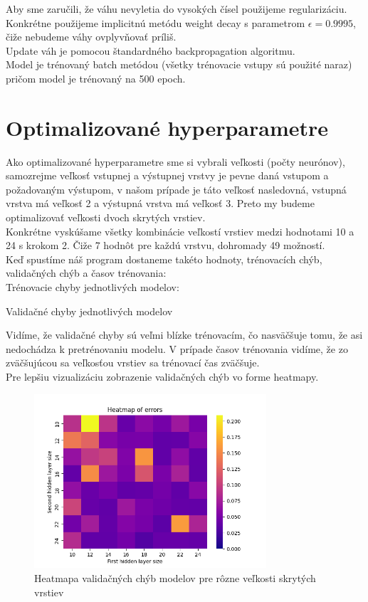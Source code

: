 \documentclass[a4paper]{article}
\begin{document}
	Aby sme zaručili, že váhu nevyletia do vysokých čísel použijeme regularizáciu. Konkrétne použijeme implicitnú metódu weight decay s parametrom $\epsilon = 0.9995$, čiže nebudeme váhy ovplyvňovať príliš.
	\\
	
	Update váh je pomocou štandardného backpropagation algoritmu.
	\\
	
	Model je trénovaný batch metódou (všetky trénovacie vstupy sú použité naraz) pričom model je trénovaný na 500 epoch.
	\newpage
	
	\section{Optimalizované hyperparametre}
	
	Ako optimalizované hyperparametre sme si vybrali veľkosti (počty neurónov), samozrejme veľkosť vstupnej a výstupnej vrstvy je pevne daná vstupom a požadovaným výstupom, v našom prípade je táto veľkosť nasledovná, vstupná vrstva má veľkosť 2 a výstupná vrstva má veľkosť 3. Preto my budeme optimalizovať veľkosti dvoch skrytých vrstiev.
	\\
	
	Konkrétne vyskúšame všetky kombinácie veľkostí vrstiev medzi hodnotami 10 a 24 s krokom 2. Čiže 7 hodnôt pre každú vrstvu, dohromady 49 možností.
	\\
	
	Keď spustíme náš program dostaneme takéto hodnoty, trénovacích chýb, validačných chýb a časov trénovania:
	\\
	
	Trénovacie chyby jednotlivých modelov:
	

	Validačné chyby jednotlivých modelov
	
	
	Vidíme, že validačné chyby sú veľmi blízke trénovacím, čo nasväčšuje tomu, že asi nedochádza k pretrénovaniu modelu. V prípade časov trénovania vidíme, že zo zväčšujúcou sa veľkosťou vrstiev sa trénovací čas zväčšuje.
	\\
	\newpage
	Pre lepšiu vizualizáciu zobrazenie validačných chýb vo forme heatmapy.
	\begin{figure}[!h]
		\centering
		\includegraphics[width=0.77\textwidth]{../heatmap_errors.png}
		\caption{Heatmapa validačných chýb modelov pre rôzne veľkosti skrytých vrstiev}
	\end{figure}
\end{document}
